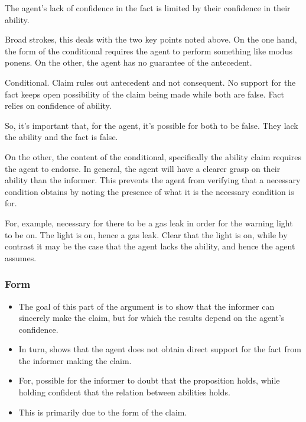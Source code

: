 \documentclass[10pt]{article}
\begin{document}
The agent's lack of confidence in the fact is limited by their confidence in their ability.





Broad strokes, this deals with the two key points noted above.
On the one hand, the form of the conditional requires the agent to perform something like modus ponens.
On the other, the agent has no guarantee of the antecedent.

Conditional.
Claim rules out antecedent and not consequent.
No support for the fact keeps open possibility of the claim being made while both are false.
Fact relies on confidence of ability.

So, it's important that, for the agent, it's possible for both to be false.
They lack the ability and the fact is false.

On the other, the content of the conditional, specifically the ability claim requires the agent to endorse.
In general, the agent will have a clearer grasp on their ability than the informer.
This prevents the agent from verifying that a necessary condition obtains by noting the presence of what it is the necessary condition is for.

For, example, necessary for there to be a gas leak in order for the warning light to be on.
The light is on, hence a gas leak.
Clear that the light is on, while by contrast it may be the case that the agent lacks the ability, and hence the agent assumes.






\subsubsection{Form}
\label{sec:form}

\begin{itemize}
\item The goal of this part of the argument is to show that the informer can sincerely make the claim, but for which the results depend on the agent's confidence.
\item In turn, shows that the agent does not obtain direct support for the fact from the informer making the claim.
\item For, possible for the informer to doubt that the proposition holds, while holding confident that the relation between abilities holds.
\item This is primarily due to the form of the claim.
\end{itemize}
\end{document}
